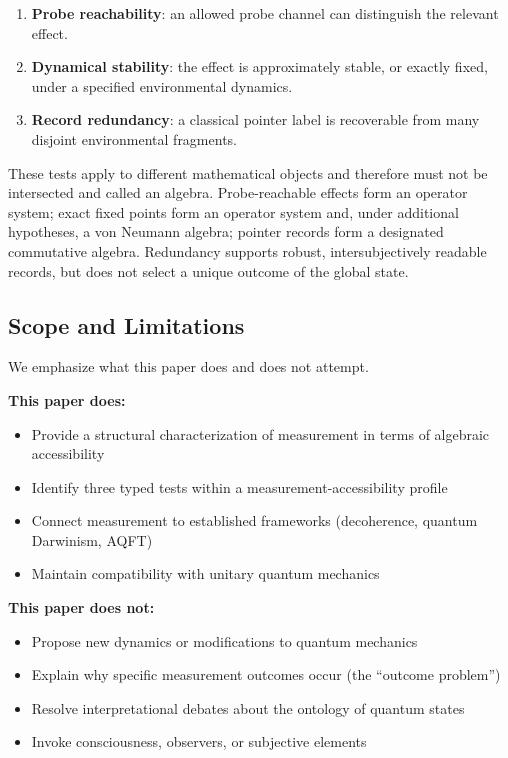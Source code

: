 \documentclass[12pt,a4paper,openany]{book}
\begin{document}
\begin{enumerate}
    \item \textbf{Probe reachability}: an allowed probe channel can distinguish the relevant effect.
    \item \textbf{Dynamical stability}: the effect is approximately stable, or exactly fixed, under a specified environmental dynamics.
    \item \textbf{Record redundancy}: a classical pointer label is recoverable from many disjoint environmental fragments.
\end{enumerate}

These tests apply to different mathematical objects and therefore must not be intersected and called an algebra. Probe-reachable effects form an operator system; exact fixed points form an operator system and, under additional hypotheses, a von Neumann algebra; pointer records form a designated commutative algebra. Redundancy supports robust, intersubjectively readable records, but does not select a unique outcome of the global state.

\subsection{Scope and Limitations}

We emphasize what this paper does and does not attempt.

\textbf{This paper does:}
\begin{itemize}
    \item Provide a structural characterization of measurement in terms of algebraic accessibility
    \item Identify three typed tests within a measurement-accessibility profile
    \item Connect measurement to established frameworks (decoherence, quantum Darwinism, AQFT)
    \item Maintain compatibility with unitary quantum mechanics
\end{itemize}

\textbf{This paper does not:}
\begin{itemize}
    \item Propose new dynamics or modifications to quantum mechanics
    \item Explain why specific measurement outcomes occur (the ``outcome problem'')
    \item Resolve interpretational debates about the ontology of quantum states
    \item Invoke consciousness, observers, or subjective elements
\end{itemize}
\end{document}
